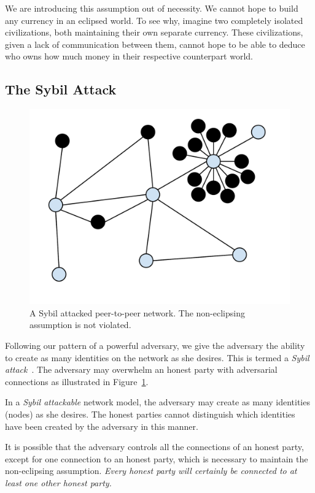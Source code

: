 We are introducing this assumption out of necessity. We cannot hope to build any currency
in an eclipsed world. To see why, imagine two completely isolated civilizations, both maintaining
their own separate currency. These civilizations, given a lack of communication between them, cannot
hope to be able to deduce who owns how much money in their respective counterpart world.

\subsection*{The Sybil Attack}

\begin{figure}[h]
    \centering
    \includegraphics[width=0.5 \columnwidth,keepaspectratio]{figures/sybil-attack.pdf}
    \caption{A Sybil attacked peer-to-peer network. The non-eclipsing assumption is not violated.}
    \label{fig.sybil}
\end{figure}

Following our pattern of a powerful adversary, we give the adversary the ability to create
as many identities on the network as she desires. This is termed a
\emph{Sybil attack}~\cite{sybil}. The adversary may overwhelm an honest party with adversarial
connections as illustrated in Figure~\ref{fig.sybil}.

\begin{definition}
  In a \emph{Sybil attackable} network model, the adversary may create as many identities (nodes)
  as she desires. The honest parties cannot distinguish which identities have been created by
  the adversary in this manner.
\end{definition}

It is possible that the adversary controls all the connections of an honest party, except for
one connection to an honest party, which is necessary to maintain the non-eclipsing assumption.
\emph{Every honest party will certainly be connected to at least one other honest party.}

